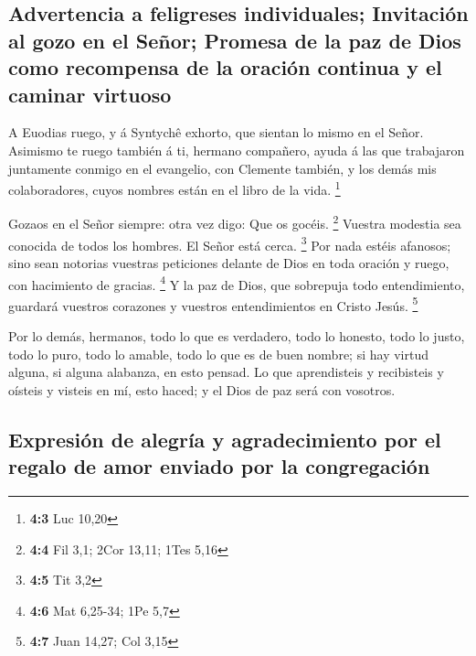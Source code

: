 \hypertarget{advertencia-a-feligreses-individuales-invitaciuxf3n-al-gozo-en-el-seuxf1or-promesa-de-la-paz-de-dios-como-recompensa-de-la-oraciuxf3n-continua-y-el-caminar-virtuoso}{%
\subsection{Advertencia a feligreses individuales; Invitación al gozo en
el Señor; Promesa de la paz de Dios como recompensa de la oración
continua y el caminar
virtuoso}\label{advertencia-a-feligreses-individuales-invitaciuxf3n-al-gozo-en-el-seuxf1or-promesa-de-la-paz-de-dios-como-recompensa-de-la-oraciuxf3n-continua-y-el-caminar-virtuoso}}

 A Euodias ruego, y á Syntychê exhorto, que sientan lo
mismo en el Señor.  Asimismo te ruego también á ti,
hermano compañero, ayuda á las que trabajaron juntamente conmigo en el
evangelio, con Clemente también, y los demás mis colaboradores, cuyos
nombres están en el libro de la vida. \footnote{\textbf{4:3} Luc 10,20}

 Gozaos en el Señor siempre: otra vez digo: Que os gocéis.
\footnote{\textbf{4:4} Fil 3,1; 2Cor 13,11; 1Tes 5,16} 
Vuestra modestia sea conocida de todos los hombres. El Señor está cerca.
\footnote{\textbf{4:5} Tit 3,2}  Por nada estéis afanosos;
sino sean notorias vuestras peticiones delante de Dios en toda oración y
ruego, con hacimiento de gracias. \footnote{\textbf{4:6} Mat 6,25-34;
  1Pe 5,7}  Y la paz de Dios, que sobrepuja todo
entendimiento, guardará vuestros corazones y vuestros entendimientos en
Cristo Jesús. \footnote{\textbf{4:7} Juan 14,27; Col 3,15}

 Por lo demás, hermanos, todo lo que es verdadero, todo lo
honesto, todo lo justo, todo lo puro, todo lo amable, todo lo que es de
buen nombre; si hay virtud alguna, si alguna alabanza, en esto pensad.
 Lo que aprendisteis y recibisteis y oísteis y visteis en
mí, esto haced; y el Dios de paz será con vosotros.

\hypertarget{expresiuxf3n-de-alegruxeda-y-agradecimiento-por-el-regalo-de-amor-enviado-por-la-congregaciuxf3n}{%
\subsection{Expresión de alegría y agradecimiento por el regalo de amor
enviado por la
congregación}\label{expresiuxf3n-de-alegruxeda-y-agradecimiento-por-el-regalo-de-amor-enviado-por-la-congregaciuxf3n}}

